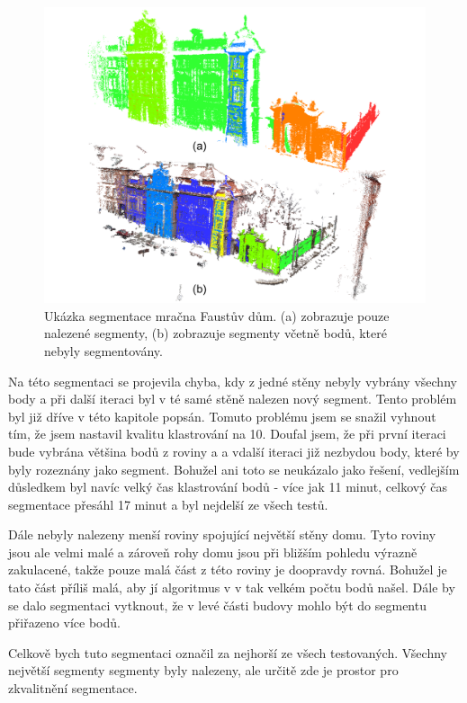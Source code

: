 \documentclass[11pt,twoside,a4paper]{book}
\begin{document}
\begin{figure}[ht]
\begin{center}
\includegraphics[width=\textwidth]{figures/test-fa}
\caption{Ukázka segmentace mračna Faustův dům. (a) zobrazuje pouze nalezené segmenty, (b) zobrazuje segmenty včetně bodů, které nebyly segmentovány.}
\label{fig:test-fa}
\end{center}
\end{figure}

Na této segmentaci se projevila chyba, kdy z jedné stěny nebyly vybrány všechny body a při další iteraci byl v té samé stěně nalezen nový segment. Tento problém byl již dříve v této kapitole popsán. Tomuto problému jsem se snažil vyhnout tím, že jsem nastavil kvalitu klastrování na 10. Doufal jsem, že při první iteraci bude vybrána většina bodů z roviny a a vdalší iteraci již nezbydou body, které by byly rozeznány jako segment. Bohužel ani toto se neukázalo jako řešení, vedlejším důsledkem byl navíc velký čas klastrování bodů - více jak 11 minut, celkový čas segmentace přesáhl 17 minut a byl nejdelší ze všech testů.

Dále nebyly nalezeny menší roviny spojující největší stěny domu. Tyto roviny jsou ale velmi malé a zároveň rohy domu jsou při bližším pohledu výrazně zakulacené, takže pouze malá část z této roviny je doopravdy rovná. Bohužel je tato část příliš malá, aby jí algoritmus v v tak velkém počtu bodů našel. Dále by se dalo segmentaci vytknout, že v levé části budovy mohlo být do segmentu přiřazeno více bodů.

Celkově bych tuto segmentaci označil za nejhorší ze všech testovaných. Všechny největší segmenty segmenty byly nalezeny, ale určitě zde je prostor pro zkvalitnění segmentace. 
\end{document}
